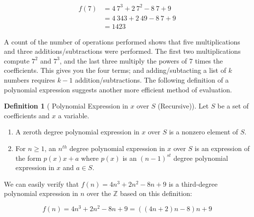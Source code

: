 \documentclass[10pt,]{book}
\theoremstyle{plain}
\theoremstyle{definition}
\newtheorem{definition}[theorem]{Definition}
\theoremstyle{definition}
\theoremstyle{definition}
\theoremstyle{definition}
\numberwithin{equation}{section}
\begin{document}
\begin{equation*}
\begin{split}
f(7) &= 4\ 7^3 + 2\ 7^2 - 8\ 7 + 9\\
			&=4\ 343 +2\ 49 -8\ 7+9 \\
			&= 1423
\end{split}
\end{equation*}
%
\par
A count of the number of operations performed shows that five multiplications and three additions/subtractions were performed. The first two multiplications compute \(7^2\) and \(7^3\), and the last three multiply the powers of 7 times the coefficients. This gives you the
four terms; and adding/subtacting a list of \(k\) numbers requires \(k-1\) addition/subtractions. The following definition of a polynomial
expression suggests another more efficient method of evaluation.%
\begin{definition}[ Polynomial Expression in \(x\) over \(S\) (Recursive)]\label{def-polynomial-expression-recursive}
Let \(S\) be a set of coefficients and \(x\) a variable.%
\par
\leavevmode%
\begin{enumerate}[label=\alph*]
\item\hypertarget{li-4}{}A zeroth degree polynomial expression in \(x\) over \(S\) is a nonzero element of \(S\).%
\item\hypertarget{li-5}{}For \(n\geq 1\), an \(n^{th}\) degree polynomial expression in \(x\) over \(S\) is an expression of the form \(p(x)x + a\) where \(p(x)\) is
an \((n-1)^{st}\) degree polynomial expression in \(x\) and \(a\in  S\).%
\end{enumerate}
%
\end{definition}
\par
We can easily verify that \(f(n) = 4n^3 + 2n^2 - 8n + 9\) is a third-degree polynomial expression in  \(n\) over the \(\mathbb{Z}\) based on this definition:

\[f(n)= 4n^3 + 2n^2 - 8n + 9 = ((4n+2)n-8)n+9\]
\end{document}
